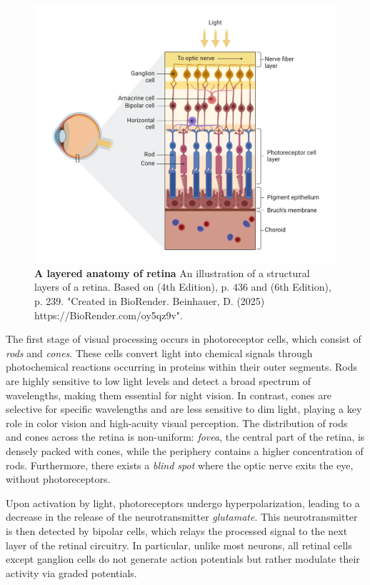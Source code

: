 \begin{figure}
    \centering
    \includegraphics[width=\linewidth]{img/retina_anatomy.pdf}
    \caption{\textbf{A layered anatomy of retina} An illustration of a structural layers of a retina. Based on \citet{schwartz1991principles} (4th Edition), p. 436 and \citet{purves2019neurosciences} (6th Edition), p. 239. "Created in BioRender. Beinhauer, D. (2025) https://BioRender.com/oy5qz9v".}
    \label{fig:retina_anatomy}
\end{figure}

The first stage of visual processing occurs in photoreceptor cells,
which consist of \emph{rods} and \emph{cones}. These cells convert light into
chemical signals through photochemical reactions occurring in proteins within
their outer segments. Rods are highly sensitive to low light levels and detect
a broad spectrum of wavelengths, making them essential for night vision. 
In contrast, cones are selective for specific wavelengths and are less sensitive
to dim light, playing a key role in color vision and high-acuity visual perception. 
The distribution of rods and cones across the retina is non-uniform: \emph{fovea},
the central part of the retina, is densely packed with cones, while the periphery
contains a higher concentration of rods. Furthermore, there exists a \emph{blind spot} 
where the optic nerve exits the eye, without photoreceptors.    

Upon activation by light, photoreceptors undergo hyperpolarization, leading to a decrease
in the release of the neurotransmitter \emph{glutamate}. This neurotransmitter is then
detected by bipolar cells, which relays the processed signal to the next layer of the
retinal circuitry. In particular, unlike most neurons, all retinal cells except ganglion
cells do not generate action potentials but rather modulate their activity via graded potentials.


